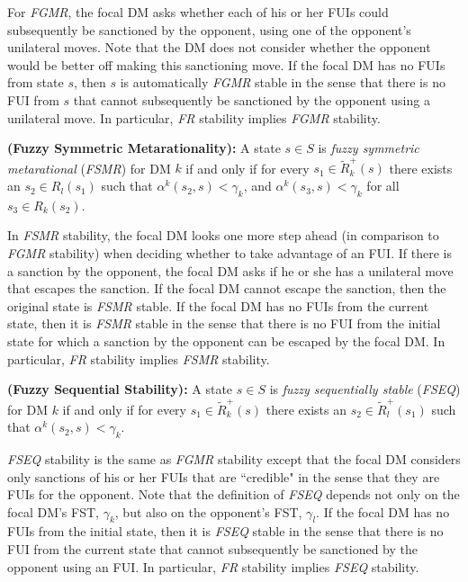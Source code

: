 For \emph{FGMR}, the focal DM asks whether each of his or her FUIs could subsequently be sanctioned by the opponent, using one of the opponent's unilateral moves. Note that the DM does not consider whether the opponent would be better off making this sanctioning move. If the focal DM has no FUIs from state $s$, then $s$ is automatically \emph{FGMR} stable in the sense that there is no FUI from $s$ that cannot subsequently be sanctioned by the opponent using a unilateral move. In particular, \emph{FR} stability implies \emph{FGMR} stability.

\begin{definition}\label{def-fsmr-2dm}
\rm {\bf (Fuzzy Symmetric Metarationality):} A state $s \in S$ is \emph{fuzzy symmetric metarational} (\emph{FSMR}) for DM $k$ if and only if for every $s_1 \in \widetilde{R}_k^+(s)$ there exists an $s_2 \in R_l(s_1)$ such that $\alpha^k(s_2, s)<\gamma_k$, and $\alpha^k(s_3, s)<\gamma_k$ for all $s_3 \in R_k(s_2)$.
\end{definition}

In \emph{FSMR} stability, the focal DM looks one more step ahead (in comparison to \emph{FGMR} stability) when deciding whether to take advantage of an FUI. If there is a sanction by the opponent, the focal DM asks if he or she has a unilateral move that escapes the sanction. If the focal DM cannot escape the sanction, then the original state is \emph{FSMR} stable. If the focal DM has no FUIs from the current state, then it is \emph{FSMR} stable in the sense that there is no FUI from the initial state for which a sanction by the opponent can be escaped by the focal DM. In particular, \emph{FR} stability implies \emph{FSMR} stability.

\begin{definition}\label{def-fseq-2dm}
\rm {\bf (Fuzzy Sequential Stability):} A state $s \in S$ is \emph{fuzzy sequentially stable} (\emph{FSEQ}) for DM $k$ if and only if for every $s_1 \in \widetilde{R}_k^+(s)$ there exists an $s_2 \in \widetilde{R}_l^+(s_1)$ such that $\alpha^k(s_2, s) < \gamma_k$.
\end{definition}

\emph{FSEQ} stability is the same as \emph{FGMR} stability except that the focal DM considers only sanctions of his or her FUIs that are ``credible" in the sense that they are FUIs for the opponent. Note that the definition of \emph{FSEQ} depends not only on the focal DM's FST, $\gamma_k$, but also on the opponent's FST, $\gamma_l$. If the focal DM has no FUIs from the initial state, then it is \emph{FSEQ} stable in the sense that there is no FUI from the current state that cannot subsequently be sanctioned by the opponent using an FUI. In particular, \emph{FR} stability implies \emph{FSEQ} stability.


